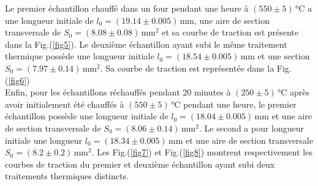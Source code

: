 \documentclass[a4paper, 12pt,oneside]{article}
\begin{document}
Le premier échantillon chauffé dans un four pendant une heure à $(550 \pm 5)$\,°C a une longueur initiale de $l_0 = (19.14 \pm 0.005)$\,mm, une aire de section transversale de $S_0 = (8.08 \pm 0.08)$\,mm$^2$ et sa courbe de traction est présente dans la Fig.(\ref{fig5}). Le deuxième échantillon ayant subi le même traitement thermique possède une longueur initiale $l_0 = (18.54 \pm 0.005)$\,mm et une section $S_0 = (7.97 \pm 0.14)$\,mm$^2$. Sa courbe de traction est représentée dans la Fig.(\ref{fig6}) \\


Enfin, pour les échantillons réchauffés pendant 20 minutes à $(250 \pm 5)$\,°C après avoir initialement été chauffés à $(550 \pm 5)$\,°C pendant une heure, le premier échantillon possède une longueur initiale de $l_0 = (18.04 \pm 0.005)$\,mm et une aire de section transversale de $S_0 = (8.06 \pm 0.14)$\,mm$^2$. Le second a pour longueur initiale une longueur $l_0 = (18.34 \pm 0.005)$\,mm et une aire de section transversale $S_0 = (8.2 \pm 0.2)$\,mm$^2$. Les Fig.(\ref{fig7}) et Fig.(\ref{fig8}) montrent respectivement les courbes de traction du premier et deuxième échantillon ayant subi deux traitements thermiques distincts.
\end{document}
